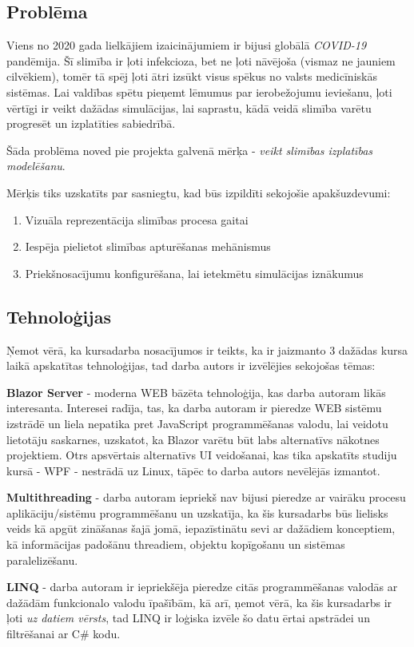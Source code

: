 
\subsection{Problēma}

Viens no 2020 gada lielkājiem izaicinājumiem ir bijusi globālā \emph{COVID-19} pandēmija.
Šī slimība ir ļoti infekcioza, bet ne ļoti nāvējoša (vismaz ne jauniem cilvēkiem), tomēr
tā spēj ļoti ātri izsūkt visus spēkus no valsts medicīniskās sistēmas. Lai valdības spētu
pieņemt lēmumus par ierobežojumu ieviešanu, ļoti vērtīgi ir veikt dažādas simulācijas,
lai saprastu, kādā veidā slimība varētu progresēt un izplatīties sabiedrībā.

Šāda problēma noved pie projekta galvenā mērķa - \emph{veikt slimības izplatības modelēšanu}.

Mērķis tiks uzskatīts par sasniegtu, kad būs izpildīti sekojošie apakšuzdevumi:

\begin{enumerate}
    \item Vizuāla reprezentācija slimības procesa gaitai
    \item Iespēja pielietot slimības apturēšanas mehānismus
    \item Priekšnosacījumu konfigurēšana, lai ietekmētu simulācijas iznākumus
\end{enumerate}

\subsection{Tehnoloģijas}

Ņemot vērā, ka kursadarba nosacījumos ir teikts, ka ir jaizmanto 3 dažādas kursa
laikā apskatītas tehnoloģijas, tad darba autors ir izvēlējies sekojošas tēmas:

\textbf{Blazor Server}\cite{blazor:info} - moderna WEB bāzēta tehnoloģija, kas darba autoram likās interesanta.
Interesei radīja, tas, ka darba autoram ir pieredze WEB sistēmu izstrādē un liela nepatika
pret JavaScript programmēšanas valodu, lai veidotu lietotāju saskarnes, uzskatot,
ka Blazor varētu būt labs alternatīvs nākotnes projektiem. Otrs apsvērtais
alternatīvs UI veidošanai, kas tika apskatīts studiju kursā - WPF\cite{wpf:info} - nestrādā uz
Linux, tāpēc to darba autors nevēlējās izmantot.

\textbf{Multithreading} - darba autoram iepriekš nav bijusi pieredze ar vairāku procesu
aplikāciju/sistēmu programmēšanu un uzskatīja, ka šis kursadarbs būs lielisks
veids kā apgūt zināšanas šajā jomā, iepazīstinātu sevi ar dažādiem konceptiem, kā
informācijas padošānu threadiem, objektu kopīgošanu un sistēmas paralelizēšanu.

\textbf{LINQ}\cite{linq:info} - darba autoram ir iepriekšēja pieredze citās programmēšanas
valodās ar dažādām funkcionalo valodu īpašībām, kā arī, ņemot vērā, ka šis
kursadarbs ir ļoti \emph{uz datiem vērsts}, tad LINQ ir loģiska izvēle šo datu
ērtai apstrādei un filtrēšanai ar C\# kodu.
